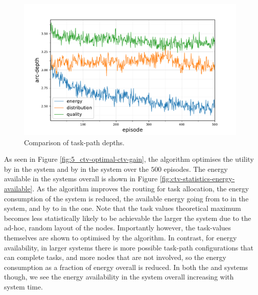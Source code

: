 \begin{figure}[ht]
\begin{minipage}{.49\textwidth}
		\includegraphics[width=1.0\linewidth,trim={25pt 0pt 50pt 0pt},clip]{5.19_ctv-arc-depth-comparison}
		\caption{Comparison of task-path depths.}
		\label{fig:ctv-arc-depth-comparison}
	\end{minipage}\hfill%
\begin{minipage}{.49\textwidth}
\end{minipage}
\end{figure}

As seen in Figure \ref{fig:5_ctv-optimal-ctv-gain}, the \algorithmBalanced{}{} algorithm optimises the utility by \resultsCTVBalancedDiff{}{}  in the \simulationSimple{}{} system and by \resultsCTVBalancedExtDiff{}{} in the \simulationExtended{}{} system over the $500$ episodes. The energy available in the systems overall is shown in Figure \ref{fig:ctv-statistics-energy-available}. As the algorithm improves the routing for task allocation, the energy consumption of the system is reduced, the available energy going from \resultsEnergyBalancedStart{}{} to \resultsEnergyBalancedEnd{}{} in the \simulationSimple{}{} system, and by \resultsEnergyBalancedExtStart{}{} to \resultsEnergyBalancedExtEnd{}{} in the \simulationExtended{}{} one. Note that the task values theoretical maximum becomes less statistically likely to be achievable the larger the system due to the ad-hoc, random layout of the nodes. Importantly however, the task-values themselves are shown to optimised by the algorithm. In contrast, for energy availability, in larger systems there is more possible task-path configurations that can complete tasks, and more nodes that are not involved, so the  energy consumption as a fraction of energy overall is reduced. In both the \simulationSimple{}{} and \simulationExtended{}{} systems though, we see the energy availability in the system overall increasing with system time.

